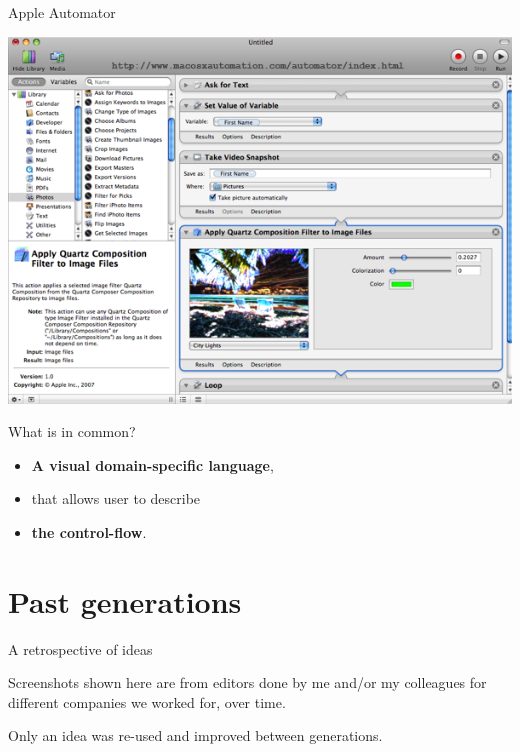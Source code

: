 \documentclass[handout]{beamer}
\begin{document}

\begin{frame}{Apple Automator}

\includegraphics[height=.8\textheight]{automator}

\end{frame}


\begin{frame}{What is in common?}

\begin{itemize}
\item \textbf{A visual domain-specific language},
\item that allows user to describe
\item \textbf{the control-flow}.
\end{itemize}

\end{frame}


\section{Past generations}


\begin{frame}{A retrospective of ideas}

Screenshots shown here are from editors done by
me and/or my colleagues for different companies
we worked for, over time.

Only an idea was re-used and improved between generations.

\end{frame}
\end{document}
